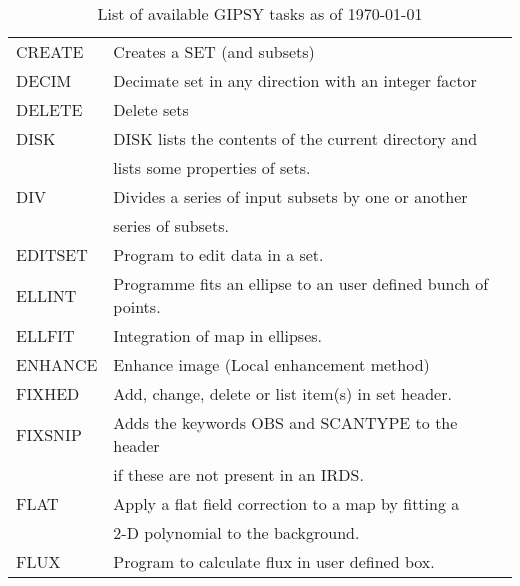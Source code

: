 \begin{table}
\begin{center}
\begin{tabular}{ | l | l | }
CREATE & Creates a SET (and subsets)\\
DECIM  & Decimate set in any direction with an integer factor \\
DELETE & Delete sets\\
DISK   & DISK lists the contents of the current directory and\\
       & lists some properties of sets.\\
DIV     & Divides a series of input subsets by one or another \\
        & series of subsets.\\
EDITSET & Program to edit data in a set.\\
ELLINT  & Programme fits an ellipse to an user defined bunch of points.\\
ELLFIT  & Integration of map in ellipses.\\
ENHANCE    & Enhance image  (Local enhancement method)\\
FIXHED     & Add, change, delete or list item(s) in set header.\\
FIXSNIP    & Adds the keywords OBS and SCANTYPE to the header\\
           & if these are not present in an IRDS.\\
FLAT       & Apply a flat field correction to a map by fitting a\\
           & 2-D polynomial to the background.\\
FLUX       & Program to calculate flux in user defined box.\\
\hline
\end{tabular}
\caption{List of available GIPSY tasks as of \today}
\label{tab:tasks}
\end{center}
\end{table}

